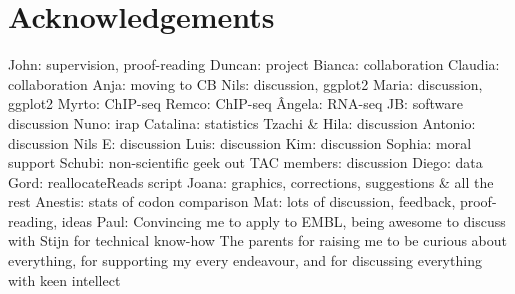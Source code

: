 \chapter{Acknowledgements}

John: supervision, proof-reading
Duncan: project
Bianca: collaboration
Claudia: collaboration
Anja: moving to CB
Nils: discussion, ggplot2
Maria: discussion, ggplot2
Myrto: ChIP-seq
Remco: ChIP-seq
Ângela: RNA-seq
JB: software discussion
Nuno: irap
Catalina: statistics
Tzachi \& Hila: discussion
Antonio: discussion
Nils E: discussion
Luis: discussion
Kim: discussion
Sophia: moral support
Schubi: non-scientific geek out
TAC members: discussion
Diego: data
Gord: reallocateReads script
Joana: graphics, corrections, suggestions \& all the rest
Anestis: stats of codon comparison
Mat: lots of discussion, feedback, proof-reading, ideas
Paul: Convincing me to apply to EMBL, being awesome to discuss with
Stijn for technical know-how
The parents for raising me to be curious about everything, for supporting my
every endeavour, and for discussing everything with keen intellect
